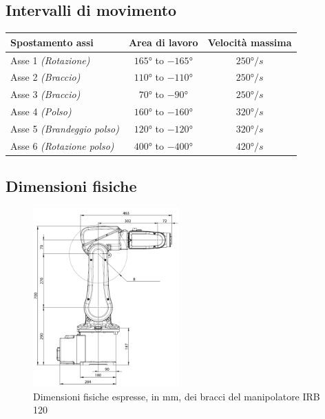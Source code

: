 \subsection{Intervalli di movimento}
\begin{center}
\label{tab:movIRB120}
\begin{tabular}{l|c|c}
	\toprule
	\textbf{Spostamento assi} & \textbf{Area di lavoro} & \textbf{Velocità massima} \\
	\midrule
	Asse 1 \emph{(Rotazione)} & $\ang{165}$ to $\ang{-165}$ & $\ang{250}/s$ \\
	Asse 2 \emph{(Braccio)} & $\ang{110}$ to $\ang{-110}$ & $\ang{250}/s$ \\
	Asse 3 \emph{(Braccio)} & $\ang{70}$ to $\ang{-90}$ & $\ang{250}/s$ \\
	Asse 4 \emph{(Polso)} &	$\ang{160}$ to $\ang{-160}$ & $\ang{320}/s$ \\ 
	Asse 5 \emph{(Brandeggio polso)} & $\ang{120}$ to $\ang{-120}$ & $\ang{320}/s$ \\
	Asse 6 \emph{(Rotazione polso)} & $\ang{400}$ to $\ang{-400}$ & $\ang{420}/s$ \\
	\bottomrule
\end{tabular}
\end{center}
\newpage
\subsection{Dimensioni fisiche}
\begin{figure}[h]
	\centering
	\includegraphics[width=0.5\textwidth]{Immagini/DimensioniManipolatore}
	\caption{Dimensioni fisiche espresse, in mm, dei bracci del manipolatore IRB 120}
	\label{fig:IRB120_Dimension}
\end{figure}
